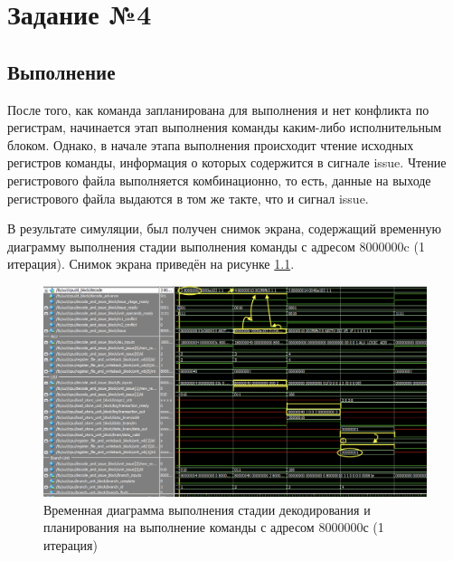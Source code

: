 \documentclass[12pt]{report}
\begin{document}
 \chapter{Задание №4}
 \section{Выполнение}
После того, как команда запланирована для выполнения и нет конфликта по регистрам, начинается этап выполнения команды каким-либо исполнительным блоком. Однако, в начале этапа выполнения происходит чтение исходных регистров команды, информация о которых содержится в сигнале issue. Чтение регистрового файла выполняется комбинационно, то есть, данные на выходе регистрового файла выдаются в том же такте, что и сигнал issue.

В результате симуляции, был получен снимок экрана, содержащий временную диаграмму выполнения стадии выполнения команды с адресом 8000000c (1 итерация). Снимок экрана приведён на рисунке \ref{lsu8000000c}.

\begin{figure}[h!p]
	\centering
	\includegraphics[width = \linewidth]{lsu8000000c.png}
	\caption{Временная диаграмма выполнения стадии декодирования и планирования на выполнение команды с адресом 8000000с (1 итерация)}
	\label{lsu8000000c}
\end{figure}
\end{document}
